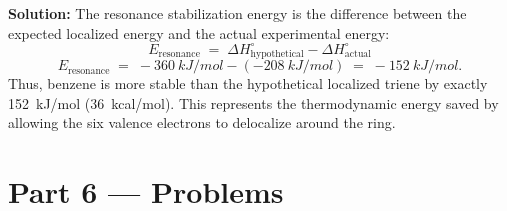 \documentclass[12pt, a4paper]{book}
\begin{document}
\begin{problembox}
\begin{enumerate}[label=\textbf{E\arabic*.}]
        \textbf{Solution:}
        The resonance stabilization energy is the difference between the expected localized energy and the actual experimental energy:
        \[
          E_{\text{resonance}} \;=\; \Delta H^\circ_{\text{hypothetical}} - \Delta H^\circ_{\text{actual}}
        \]
        \[
          E_{\text{resonance}} \;=\; -\SI{360}{kJ/mol} - (-\SI{208}{kJ/mol}) \;=\; -\SI{152}{kJ/mol}.
        \]
        Thus, benzene is more stable than the hypothetical localized triene by exactly \SI{152}{kJ/mol} (\SI{36}{kcal/mol}). This represents the thermodynamic energy saved by allowing the six valence electrons to delocalize around the ring.
\end{enumerate}
\end{problembox}

\newpage

\section{Part 6 --- Problems}
\end{document}
